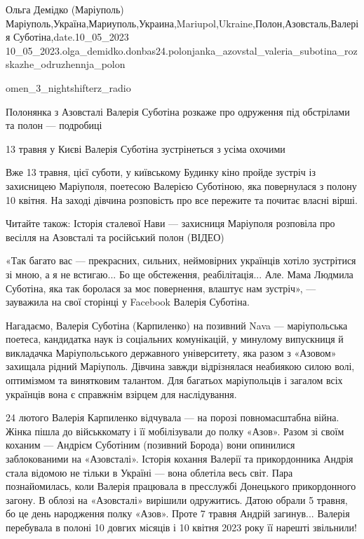  
 
 
 
 

Ольга Демідко (Маріуполь)
Маріуполь,Україна,Мариуполь,Украина,Mariupol,Ukraine,Полон,Азовсталь,Валерія Суботіна,date.10_05_2023
10_05_2023.olga_demidko.donbas24.polonjanka_azovstal_valeria_subotina_rozskazhe_odruzhennja_polon

omen_3_nightshifterz_radio

Полонянка з Азовсталі Валерія Суботіна розкаже про одруження під обстрілами та полон — подробиці

13 травня у Києві Валерія Суботіна зустрінеться з усіма охочими

Вже 13 травня, цієї суботи, у київському Будинку кіно пройде зустріч із
захисницею Маріуполя, поетесою Валерією Суботіною, яка повернулася з полону 10
квітня. На заході дівчина розповість про все пережите та почитає власні вірші.

Читайте також: Історія сталевої Нави — захисниця Маріуполя розповіла про
весілля на Азовсталі та російський полон (ВІДЕО)

«Так багато вас — прекрасних, сильних, неймовірних українців хотіло зустрітися
зі мною, а я не встигаю... Бо ще обстеження, реабілітація... Але. Мама Людмила
Суботіна, яка так боролася за моє повернення, влаштує нам зустріч», — зауважила
на свої сторінці у Facebook Валерія Суботіна.

Нагадаємо, Валерія Суботіна (Карпиленко) на позивний Nava — маріупольська
поетеса, кандидатка наук із соціальних комунікацій, у минулому випускниця й
викладачка Маріупольського державного університету, яка разом з «Азовом»
захищала рідний Маріуполь. Дівчина завжди відрізнялася неабиякою силою волі,
оптимізмом та винятковим талантом. Для багатьох маріупольців і загалом всіх
українців вона є справжнім взірцем для наслідування.

24 лютого Валерія Карпиленко відчувала — на порозі повномасштабна війна. Жінка
пішла до військкомату і її мобілізували до полку «Азов». Разом зі своїм коханим
— Андрієм Суботіним (позивний Борода) вони опинилися заблокованими на
«Азовсталі». Історія кохання Валерії та прикордонника Андрія стала відомою не
тільки в Україні — вона облетіла весь світ. Пара познайомилась, коли Валерія
працювала в пресслужбі Донецького прикордонного загону. В облозі на «Азовсталі»
вирішили одружитись. Датою обрали 5 травня, бо це день народження полку «Азов».
Проте 7 травня Андрій загинув... Валерія перебувала в полоні 10 довгих місяців і
10 квітня 2023 року її нарешті звільнили!

